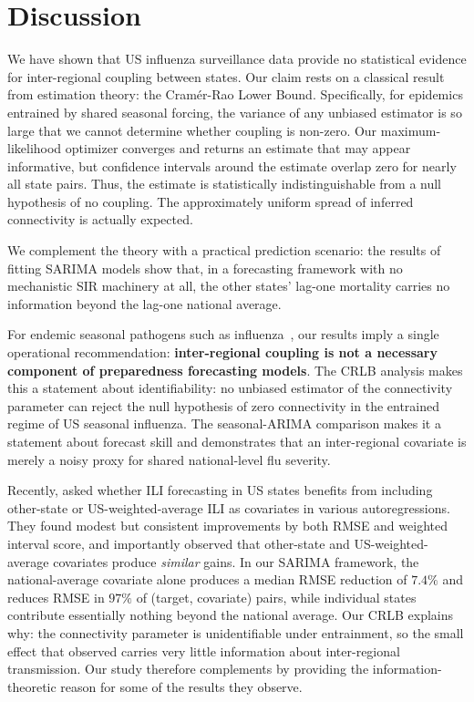 \section{Discussion}

We have shown that US influenza surveillance data provide no
statistical evidence for inter-regional coupling between states. Our
claim rests on a classical result from estimation theory: the
Cram\'er-Rao Lower Bound. Specifically, for epidemics entrained by
shared seasonal forcing, the variance of any unbiased estimator is so
large that we cannot determine whether coupling is non-zero. Our
maximum-likelihood optimizer converges and returns an estimate that
may appear informative, but confidence intervals around the estimate
overlap zero for nearly all state pairs. Thus, the estimate is
statistically indistinguishable from a null hypothesis of no
coupling. The approximately uniform spread of inferred connectivity is
actually expected.

We complement the theory with a practical prediction scenario: the
results of fitting SARIMA models show that, in a forecasting framework
with no mechanistic SIR machinery at all, the other states' lag-one
mortality carries no information beyond the lag-one national average.

For endemic seasonal pathogens such as influenza~\citep{viboud2006,
  tamerius2013}, our results imply a single operational
recommendation: \textbf{inter-regional coupling is not a necessary
  component of preparedness forecasting models}. The CRLB analysis
makes this a statement about identifiability: no unbiased estimator of
the connectivity parameter can reject the null hypothesis of zero
connectivity in the entrained regime of US seasonal influenza. The
seasonal-ARIMA comparison makes it a statement about forecast skill
and demonstrates that an inter-regional covariate is merely a noisy
proxy for shared national-level flu severity.


Recently, \citet{thivierge2025} asked whether ILI forecasting in US
states benefits from including other-state or US-weighted-average ILI
as covariates in various autoregressions. They found modest but
consistent improvements by both RMSE and weighted interval score, and
importantly observed that other-state and US-weighted-average
covariates produce \emph{similar} gains. In our SARIMA framework, the
national-average covariate alone produces a median RMSE reduction of
$7.4\%$ and reduces RMSE in $97\%$ of (target, covariate) pairs, while
individual states contribute essentially nothing beyond the national
average. Our CRLB explains why: the connectivity parameter is
unidentifiable under entrainment, so the small effect that
\citet{thivierge2025} observed carries very little information about
inter-regional transmission. Our study therefore complements
\citet{thivierge2025} by providing the information-theoretic reason
for some of the results they observe.

